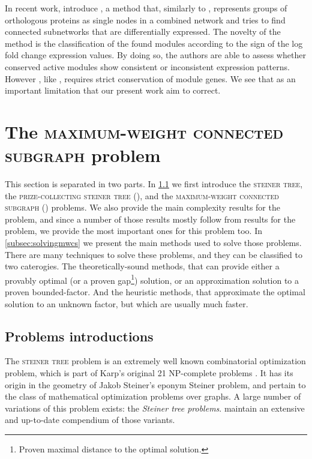 		In recent work, \textcite{zinman2015moduleblast} introduce \moduleblast{}, a method that, similarly to \nexus{}, represents groups of orthologous proteins as single nodes in a combined network and tries to find connected subnetworks that are differentially expressed.
		The novelty of the method is the classification of the found modules according to the sign of the log fold change expression values.
		By doing so, the authors are able to assess whether conserved active modules show consistent or inconsistent
  expression patterns.
		However \moduleblast{}, like \nexus{}, requires strict conservation of module genes.
		We see that as an important limitation that our present work aim to correct.

\section{The \textsc{maximum-weight connected subgraph} problem}
\label{sec:mwcsproblem}

	This section is separated in two parts.
	In \cref{subsec:mwcsintro} we first introduce the \textsc{steiner tree}, the \textsc{prize-collecting steiner tree} (\pcst{}), and the \textsc{maximum-weight connected subgraph} (\mwcs{}) problems.
	We also provide the main complexity results for the \mwcs{} problem, and since a number of those results mostly follow from results for the \pcst{} problem, we provide the most important ones for this problem too.
	In \cref{subsec:solvingmwcs} we present the main methods used to solve those problems.
	There are many techniques to solve these problems, and they can be classified to two caterogies.
	The theoretically-sound methods, that can provide either a provably optimal (or a proven gap\footnote{Proven maximal distance to the optimal solution.}) solution, or an approximation solution to a proven bounded-factor.
	And the heuristic methods, that approximate the optimal solution to an unknown factor, but which are usually much faster.

	\subsection{Problems introductions}
	\label{subsec:mwcsintro}

	The \textsc{steiner tree} problem is an extremely well known combinatorial optimization problem, which is part of Karp's original 21 NP-complete problems \parencite{karp1972reducibility}.
	It has its origin in the geometry of Jakob Steiner's eponym Steiner problem, and pertain to the class of mathematical optimization problems over graphs.
	A large number of variations of this problem exists: the \emph{Steiner tree problems}.
	\Textcite{hauptmann2014compendium} maintain an extensive and up-to-date compendium of those variants.

